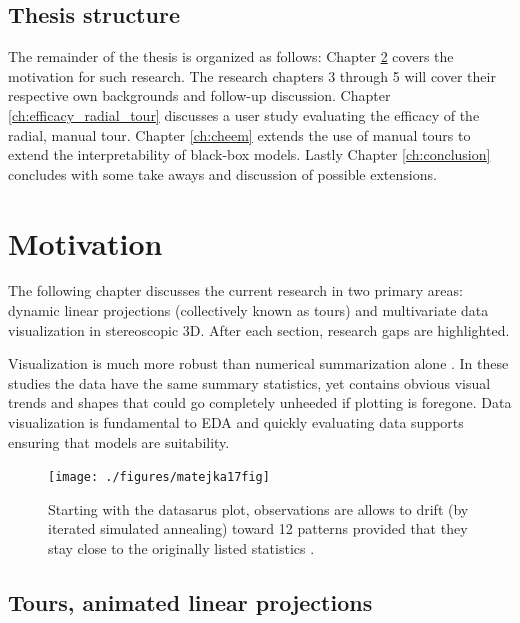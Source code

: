\documentclass{template/monashthesis}
\begin{document}
\hypertarget{thesis-structure}{%
\section{Thesis structure}\label{thesis-structure}}

The remainder of the thesis is organized as follows: Chapter \ref{ch:motivation} covers the motivation for such research. The research chapters 3 through 5 will cover their respective own backgrounds and follow-up discussion. Chapter \ref{ch:efficacy_radial_tour} discusses a user study evaluating the efficacy of the radial, manual tour. Chapter \ref{ch:cheem} extends the use of manual tours to extend the interpretability of black-box models. Lastly Chapter \ref{ch:conclusion} concludes with some take aways and discussion of possible extensions.

\hypertarget{ch:motivation}{%
\chapter{Motivation}\label{ch:motivation}}

The following chapter discusses the current research in two primary areas: dynamic linear projections (collectively known as tours) and multivariate data visualization in stereoscopic 3D. After each section, research gaps are highlighted.

Visualization is much more robust than numerical summarization alone \autocite{anscombe_graphs_1973,matejka_same_2017}. In these studies the data have the same summary statistics, yet contains obvious visual trends and shapes that could go completely unheeded if plotting is foregone. Data visualization is fundamental to EDA and quickly evaluating data supports ensuring that models are suitability.



\begin{figure}

{\centering \texttt{[image: ./figures/matejka17fig]} 

}

\caption{Starting with the datasarus plot, observations are allows to drift (by iterated simulated annealing) toward 12 patterns provided that they stay close to the originally listed statistics \autocite{matejka_same_2017}.}\label{fig:matejka17fig}
\end{figure}

\hypertarget{sec:tour}{%
\section{Tours, animated linear projections}\label{sec:tour}}
\end{document}

